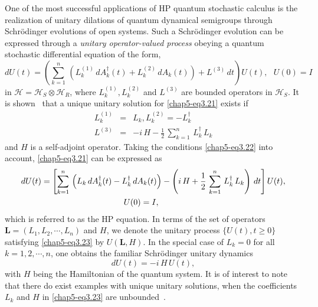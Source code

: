 One of the most successful applications of  HP quantum stochastic calculus is the realization of unitary dilations of quantum dynamical semigroups through Schr{\"o}dinger evolutions of open systems. Such a Schr{\"o}dinger evolution can be expressed through a {\it unitary operator-valued process} obeying a quantum stochastic differential equation of the form,
\begin{equation}
dU(t) =\left(\sum_{k=1}^n\, \left(L^{(1)}_k\, dA^\dag_k(t) +
L^{(2)}_k\, dA_k(t) \right) + L^{(3)}\, dt \right)\! U(t),\ \ \ U(0)=I \label{chap5-eq3.21}  
\end{equation} 
in  $\mathcal{H}=\mathcal{H}_S\otimes \mathcal{H}_R$, where  $L^{(1)}_k, L^{(2)}_k$ and  $L^{(3)}$  are bounded operators in $\mathcal{H}_S$. It is shown~\cite{key7} that a unique unitary solution for \eqref{chap5-eq3.21} exists if  
\begin{eqnarray}
L^{(1)}_k&=&L_k, L^{(2)}_k=-L^\dag_k\nonumber \\
L^{(3)}&=&-i\, H - \frac{1}{2}\, \sum_{k=1}^n\, L_k^\dag\, L_k \label{chap5-eq3.22}  
\end{eqnarray}
and $H$ is a self-adjoint operator.  Taking the conditions \eqref{chap5-eq3.22} into account, \eqref{chap5-eq3.21} can be expressed as~\cite{key7, key8}  
\begin{align}
dU(t) &=\left[\sum_{k=1}^n\, \left(L_k\, dA^\dag_k(t) -L^\dag_k\, dA_k(t)\right) -\left(i\, H+ \frac{1}{2}\, \sum_{k=1}^n\, L_k^\dag\, L_k \right) \, dt \right] U(t),\notag \\ 
& \qquad \qquad \qquad \qquad \qquad U(0)=I, \label{chap5-eq3.23}
\end{align}
which is referred to as the HP equation. In terms of the set of operators $\mathbf{L}=(L_1,L_2,\cdots, L_n)$ and $H$, we denote the unitary process $\{U(t), t\geq 0\}$ satisfying \eqref{chap5-eq3.23} by  $U\! (\mathbf{L}, H)$. In the special case of $L_k=0$ for all $k=1,2,\cdots, n$, one obtains the familiar Schr{\"o}dinger unitary dynamics 
\begin{equation}
dU(t)=-i\, H\, U(t), \label{chap5-eq3.24}  
\end{equation}
with $H$ being the Hamiltonian of the quantum system.    It is of interest to note that there do exist examples with unique unitary solutions, when the coefficients $L_k$ and $H$ in \eqref{chap5-eq3.23} are unbounded~\cite{key3,key4,key5,key6}. 


